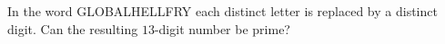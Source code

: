 In the word GLOBALHELLFRY each distinct letter is replaced by a distinct digit. Can the resulting $13$-digit number be prime?
